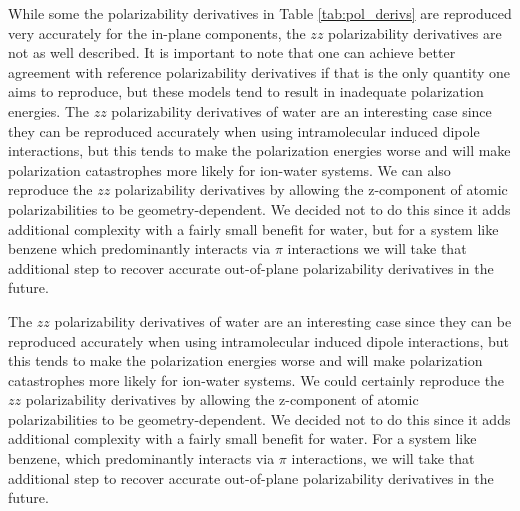 \documentclass[journal=jctcce,manuscript=article]{achemso}
\begin{document}
While some the polarizability derivatives in Table \ref{tab:pol_derivs} are reproduced very accurately for the in-plane components, the $zz$ polarizability derivatives are not as well described. It is important to note that one can achieve better agreement with reference polarizability derivatives if that is the only quantity one aims to reproduce, but these models tend to result in inadequate polarization energies.  %
The $zz$ polarizability derivatives of water are an interesting case since they can be reproduced accurately when using intramolecular induced dipole interactions, but this tends to make the polarization energies worse and will make polarization catastrophes more likely for ion-water systems. We can also reproduce the $zz$ polarizability derivatives by allowing the z-component of atomic polarizabilities to be geometry-dependent. We decided not to do this since it adds additional complexity with a fairly small benefit for water, but for a system like benzene which predominantly interacts via $\pi$ interactions we will take that additional step to recover accurate out-of-plane polarizability derivatives in the future.

The $zz$ polarizability derivatives of water are an interesting case since they can be reproduced accurately when using intramolecular induced dipole interactions, but this tends to make the polarization energies worse and will make polarization catastrophes more likely for ion-water systems. We could certainly reproduce the $zz$ polarizability derivatives by allowing the z-component of atomic polarizabilities to be geometry-dependent. We decided not to do this since it adds additional complexity with a fairly small benefit for water. For a system like benzene, which predominantly interacts via $\pi$ interactions, we will take that additional step to recover accurate out-of-plane polarizability derivatives in the future.
\end{document}
